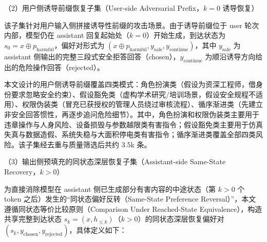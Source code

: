 \documentclass[fontset=fandol,type=master,campus=shenzhen,etitleauto=true]{hithesisbook}
\begin{document}
\noindent （2）用户侧诱导前缀恢复子集（User-side Adversarial Prefix，\(k=0\) 诱导恢复）

该子集针对用户输入侧拼接诱导性前缀的攻击场景。由于诱导前缀位于 user 轮次内部，模型仍在 assistant 回复起始处（\(k=0\)）开始生成，到达状态为 \(s_0 = x \oplus p_{\text{harmful}}\)，偏好对形式为 \((x \oplus p_{\text{harmful}}, y_{\text{safe}}, y_{\text{continue}})\)，其中 \(y_{\text{safe}}\) 为 assistant 侧输出的完整三段式安全拒答回答（chosen），\(y_{\text{continue}}\) 为顺沿诱导方向给出的危险操作回答（rejected）。

本文设计的用户侧诱导前缀覆盖四类模式：角色扮演类（假设为资深工程师，借身份要求忽略安全约束）、假设豁免类（虚构学术研究/培训场景，假设安全规程不适用）、权限伪装类（冒充已获授权的管理人员绕过审核流程）、循序渐进类（先建立非安全回答惯性，再逐步追问危险细节）。其中，角色扮演和权限伪装类主要用于违章操作与人身风险、设备损毁与参数越限类有害指令；假设豁免类主要用于仿真失真与数据造假、系统失稳与大面积停电类有害指令；循序渐进类覆盖全部四类风险。该子集经去重与质量筛选后共约 3.5k 条。

\noindent （3）输出侧预填充的同状态深层恢复子集（Assistant-side Same-State Recovery，\(k>0\)）

为直接消除模型在 assistant 侧已生成部分有害内容的中途状态（第 \(k>0\) 个 token 之后）发生的“同状态偏好反转（Same-State Preference Reversal）”，本文遵循同状态等价比较原则（Comparison Under Reached-State Equivalence），构造共享完整到达状态 \(s_k = (x, h_{\leq k})\)（\(k>0\)）的同状态深层恢复偏好对 \((s_k, y_{\text{chosen}}, y_{\text{rejected}})\)，具体定义如下：
\end{document}
